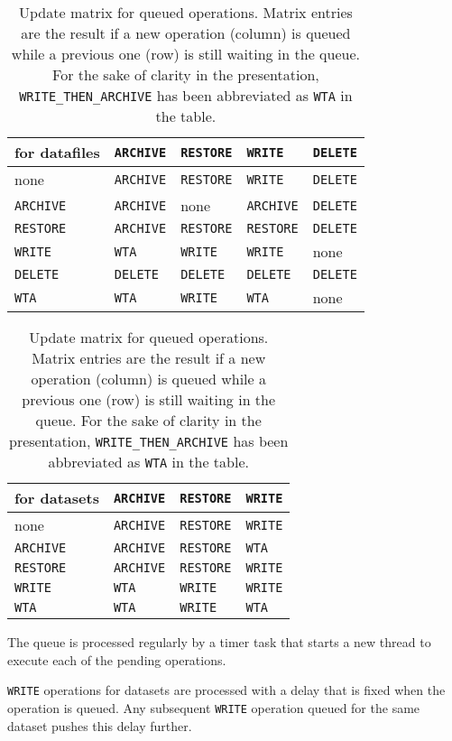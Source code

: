 \documentclass[paper=a4]{scrartcl}
\begin{document}
\begin{table}
 \begin{tabular}{l|llll}
  for datafiles    & \texttt{ARCHIVE} & \texttt{RESTORE} & \texttt{WRITE}   & \texttt{DELETE} \\
  \hline
  none             & \texttt{ARCHIVE} & \texttt{RESTORE} & \texttt{WRITE}   & \texttt{DELETE} \\
  \texttt{ARCHIVE} & \texttt{ARCHIVE} & none             & \texttt{ARCHIVE} & \texttt{DELETE} \\
  \texttt{RESTORE} & \texttt{ARCHIVE} & \texttt{RESTORE} & \texttt{RESTORE} & \texttt{DELETE} \\
  \texttt{WRITE}   & \texttt{WTA}     & \texttt{WRITE}   & \texttt{WRITE}   & none \\
  \texttt{DELETE}  & \texttt{DELETE}  & \texttt{DELETE}  & \texttt{DELETE}  & \texttt{DELETE} \\
  \texttt{WTA}     & \texttt{WTA}     & \texttt{WRITE}   & \texttt{WTA}     & none \\
 \end{tabular}
 \bigbreak
 \begin{tabular}{l|lll}
  for datasets     & \texttt{ARCHIVE} & \texttt{RESTORE} & \texttt{WRITE} \\
  \hline
  none             & \texttt{ARCHIVE} & \texttt{RESTORE} & \texttt{WRITE} \\
  \texttt{ARCHIVE} & \texttt{ARCHIVE} & \texttt{RESTORE} & \texttt{WTA} \\
  \texttt{RESTORE} & \texttt{ARCHIVE} & \texttt{RESTORE} & \texttt{WRITE} \\
  \texttt{WRITE}   & \texttt{WTA}     & \texttt{WRITE}   & \texttt{WRITE} \\
  \texttt{WTA}     & \texttt{WTA}     & \texttt{WRITE}   & \texttt{WTA} \\
 \end{tabular}
 \caption{Update matrix for queued operations.  Matrix entries are the
   result if a new operation (column) is queued while a previous one
   (row) is still waiting in the queue.  For the sake of clarity in
   the presentation, \texttt{WRITE\_THEN\_ARCHIVE} has been
   abbreviated as \texttt{WTA} in the table.}
 \label{tab:fsm}
\end{table}

The queue is processed regularly by a timer task that starts a new
thread to execute each of the pending operations.

\texttt{WRITE} operations for datasets are processed with a delay
that is fixed when the operation is queued.  Any subsequent
\texttt{WRITE} operation queued for the same dataset pushes this
delay further.
\end{document}
